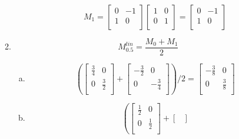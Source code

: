 \documentclass[11pt, oneside]{article}
\begin{document}
\begin{enumerate}[Problem 1:]
\begin{enumerate}[1.]
\begin{enumerate}[a)]
            \[
              M_1 = 
              \begin{bmatrix}
                0 & -1\\
                1 & 0\\
              \end{bmatrix}
              \begin{bmatrix}
                1 & 0\\
                0 & 1\\
              \end{bmatrix}
              =
              \begin{bmatrix}
                0 & -1\\
                1 & 0\\
              \end{bmatrix}
            \]
        \end{enumerate}
      \item
        \[ M^{lin}_{0.5} = \frac {M_0 + M_1} 2 \]
        \begin{enumerate}[a)]
          \item
            \[
              \left(
                \begin{bmatrix}
                  \frac 3 4 & 0\\
                  0 & \frac 3 2\\
                \end{bmatrix}
                +
                \begin{bmatrix}
                  -\frac 3 2 & 0\\
                  0 & -\frac 3 4\\
                \end{bmatrix}
              \right)
              \Big/ 2
              =
              \begin{bmatrix}
                -\frac 3 8 & 0\\
                0 & \frac 3 8\\
              \end{bmatrix}
            \]
          \item
            \[
              \left(
                \begin{bmatrix}
                  \frac 1 2 & 0\\
                  0 & \frac 1 2\\
                \end{bmatrix}
                +
                \begin{bmatrix}

\end{bmatrix}\]
\end{enumerate}
\end{enumerate}
\end{enumerate}
\end{document}
